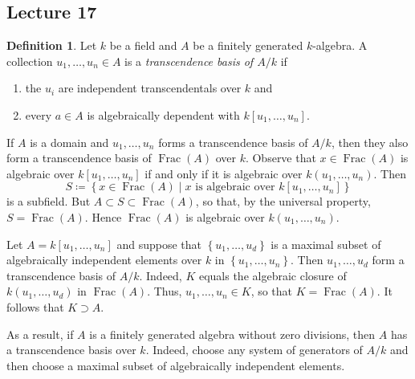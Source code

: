 \documentclass[10pt,letterpaper,cm]{nupset}
\theoremstyle{definition}
\newtheorem{definition}{Definition}[subsection]
\theoremstyle{theorem}
\theoremstyle{remark}
\newcommand{\1}{\mathbf{1}}
\newcommand{\0}{\vec 0}
\DeclareMathOperator{\Frac}{Frac}
\begin{document}
\subsection{Lecture 17}

\begin{definition}
Let $k$ be a field and $A$ be a finitely generated $k$-algebra. A collection $u_1, \ldots, u_n \in A$ is a \textit{transcendence basis of $A/k$} if 
\begin{enumerate}[label=(\roman*)]
\item the $u_i$ are independent transcendentals over $k$ and
\item every $a\in A$ is algebraically dependent with $k[u_1, \ldots, u_n]$. 
\end{enumerate}
\end{definition}


If $A$ is a domain and $u_1, \ldots, u_n$ forms a transcendence basis of $A/k$, then they also form a transcendence basis of $\Frac(A)$ over $k$. Observe that $x\in \Frac(A)$ is algebraic over $k[u_1, \ldots, u_n]$ if and only if it is algebraic over $k(u_1, \ldots, u_n)$. Then $$S\coloneqq  \left\{x\in \Frac(A) \mid x \text{ is algebraic over }k[u_1, \ldots, u_n]\right\}$$ is a subfield. But $A \subset S \subset \Frac(A)$, so that, by the universal property, $S= \Frac(A)$. Hence $\Frac(A)$ is algebraic over $k(u_1, \ldots, u_n)$. 

Let $A = k[u_1, \ldots, u_n]$ and suppose that $\left\{u_1, \ldots, u_d\right\}$ is a maximal subset of algebraically independent elements over $k$ in $\left\{u_1, \ldots, u_n\right\}$. Then $u_1, \ldots, u_d$ form a transcendence basis of $A/k$. Indeed, $K$ equals the algebraic closure of $k(u_1, \ldots, u_d)$ in $\Frac(A)$. Thus, $u_1, \ldots, u_n \in K$, so that $K = \Frac(A)$. It follows that $K \supset A$. 

As a result, if $A$ is a finitely generated algebra without zero divisions, then $A$ has a transcendence basis over $k$. Indeed, choose any system of generators of $A/k$ and then choose a maximal subset of algebraically independent elements. 
\end{document}
